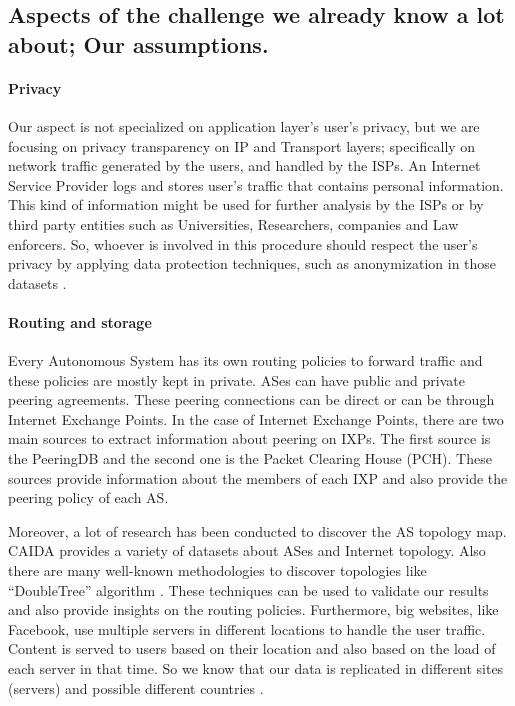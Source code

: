\subsection{Aspects of the challenge we already know a lot about; Our
assumptions.}

\paragraph{Privacy}

Our aspect is not specialized  on application layer's  user's privacy,  
but we are focusing on privacy transparency on IP and Transport layers; 
specifically on  network traffic generated by the users, and  handled by the ISPs.
An Internet Service Provider logs and stores user's traffic that contains 
personal information. 
This kind of information might be used for further analysis by the ISPs or by 
third party entities such as Universities, Researchers, companies and Law enforcers.	
So, whoever is involved in this procedure should respect the user's privacy by 
applying data protection techniques, such as anonymization in those datasets
\cite{infsec, sweeney2002k, dark}.

\paragraph{Routing and storage}

Every Autonomous System has its own routing policies to forward traffic and these 
policies are mostly kept in private. ASes can have public and private peering 
agreements. These peering connections can be direct or can be through Internet 
Exchange Points. In the case of Internet Exchange Points, there are two main 
sources to extract information about peering on IXPs. The first source is the 
PeeringDB and the second one is the Packet Clearing House (PCH). 
These sources provide information about the members of each IXP and also provide
the peering policy of each AS. 

Moreover, a lot of research has been conducted to discover the AS topology map. 
CAIDA provides a variety of datasets about ASes and Internet topology. Also there 
are many well-known methodologies to discover topologies like ``DoubleTree'' 
algorithm \cite{caida}. These techniques can be used  to validate our results 
and also provide insights on the routing policies. Furthermore, big websites, 
like Facebook, use multiple servers in different locations to handle the user 
traffic. Content is served to users based on their location and 
also based on the load of each server in that time. So we know that our data is 
replicated in different sites (servers) and possible different countries \cite{dark}. 


